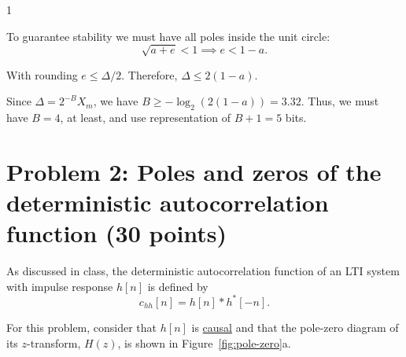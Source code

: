 \documentclass[10pt]{article}
\def\SOLUTIONS{0} %
\def\SolutionsColor{red2}
\begin{document}
\begin{description}
\if\SOLUTIONS1
{\color{\SolutionsColor} To guarantee stability we must have all poles inside the unit circle:
\begin{equation*}
\sqrt{a + e} < 1 \implies e < 1 - a.
\end{equation*}

With rounding $e \leq \Delta/2$. Therefore, $\Delta \leq 2(1-a)$.

Since $\Delta = 2^{-B}X_m$, we have $B \geq -\log_2(2(1-a)) = 3.32$. Thus, we must have $B = 4$, at least, and use representation of $B+1 = 5$ bits.
}
\else\vspace{4cm}
\fi

\end{description}
\newpage

\section*{Problem 2: Poles and zeros of the deterministic autocorrelation function (30 points)}
As discussed in class, the deterministic autocorrelation function of an LTI system with impulse response $h[n]$ is defined by
\begin{equation}
c_{hh}[n] = h[n] \ast h^*[-n].
\end{equation}

For this problem, consider that $h[n]$ is \underline{causal} and that the pole-zero diagram of its $z$-transform, $H(z)$, is shown in Figure~\ref{fig:pole-zero}a.
\end{document}
